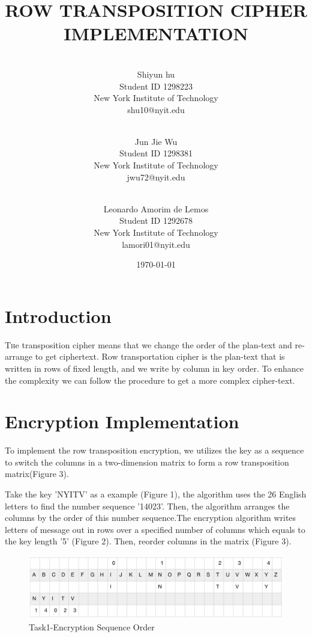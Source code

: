 \documentclass[twoside,twocolumn]{article}
\title{ROW TRANSPOSITION CIPHER IMPLEMENTATION} %
\author{ \\ \footnotesize Shiyun hu  \\ \footnotesize Student ID 1298223\\ \footnotesize New York Institute of Technology \\ \footnotesize shu10@nyit.edu \and \\\footnotesize Jun Jie Wu \\ \footnotesize Student ID 1298381 \\ \footnotesize New York Institute of Technology \\ \footnotesize jwu72@nyit.edu  \and \\ \footnotesize Leonardo Amorim de Lemos  \\ \footnotesize Student ID 1292678\\ \footnotesize New York Institute of Technology\\ \footnotesize lamori01@nyit.edu \\}
\date{\today} %
\begin{document}
\maketitle


\section{Introduction}

\lettrine[nindent=2em,lines=1] {T}he transposition cipher means that we change the order of the plan-text and re-arrange to get ciphertext. Row transportation cipher is the plan-text that is written in rows of fixed length, and we write by column in key order. To enhance the complexity we can follow the procedure to get a more complex cipher-text.


\section{Encryption Implementation}
To implement the row transposition encryption, we utilizes the key as a sequence to switch the columns in a two-dimension matrix to form a row transposition matrix(Figure 3).

Take the key 'NYITV' as a example (Figure 1), the algorithm uses the 26 English letters to find the number sequence '14023'. Then, the algorithm arranges the columns by the order of this number sequence.The encryption algorithm writes letters of message out in rows over a specified number of columns which equals to the key length '5' (Figure 2). Then, reorder columns in the matrix (Figure 3).



\begin{figure}[!ht]
  \centering
  \includegraphics[scale=0.3]{./Graphs/Figure1.1.png}
  \caption{Task1-Encryption Sequence Order}
  \label{fig:testfig1}
\end{figure}
\end{document}
